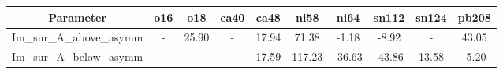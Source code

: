 \begin{tabular}{|c||c||c||c||c||c||c||c||c||c|} 
 \hline 
\bf{Parameter}& \bf{o16}& \bf{o18}& \bf{ca40}& \bf{ca48}& \bf{ni58}& \bf{ni64}& \bf{sn112}& \bf{sn124}& \bf{pb208}\\
 \hline
 \hline 
Im\_sur\_A\_above\_asymm & - & 25.90 & - & 17.94 & 71.38 & -1.18 & -8.92 & - & 43.05\\
Im\_sur\_A\_below\_asymm & - & - & - & 17.59 & 117.23 & -36.63 & -43.86 & 13.58 & -5.20\\

 \hline 
\end{tabular}